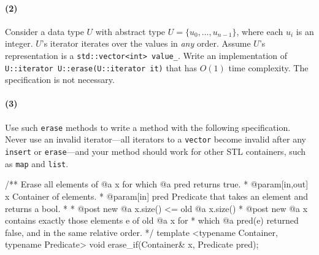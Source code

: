 \documentclass[12pt,letterpaper,twoside]{article}
\begin{document}
\paragraph{(2)} Consider a data type $U$ with abstract type $U = \{u_0,\dots,u_{n-1}\}$, where each $u_i$ is an integer. $U$'s iterator iterates over the values in \emph{any} order. Assume $U$'s representation is a \texttt{std::vector<int> value\_}. Write an implementation of \texttt{U::iterator U::erase(U::iterator it)} that has $O(1)$ time complexity. The specification is not necessary.

\paragraph{(3)} Use such \texttt{erase} methods to write a method with the
following specification. Never use an invalid iterator---all iterators to a
\texttt{vector} become invalid after any \texttt{insert} or
\texttt{erase}---and your method should work for other STL containers, such
as \texttt{map} and \texttt{list}.

\begin{cpp}
/** Erase all elements of @a x for which @a pred returns true.
 * @param[in,out] x Container of elements.
 * @param[in] pred Predicate that takes an element and returns a bool.
 *
 * @post new @a x.size() <= old @a x.size()
 * @post new @a x contains exactly those elements e of old @a x for 
 *     which @a pred(e) returned false, and in the same relative order.
 */
template <typename Container, typename Predicate>
void erase_if(Container& x, Predicate pred);
\end{cpp}
\end{document}
